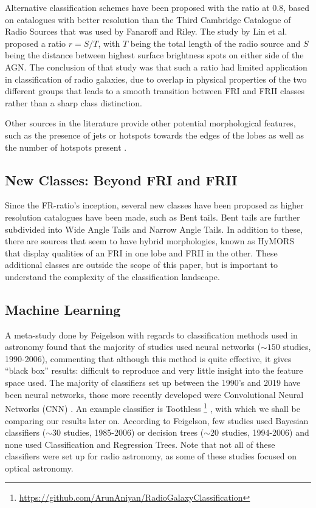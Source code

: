 \documentclass[conference]{IEEEtran}
\begin{document}
Alternative classification schemes have been proposed with the ratio at 0.8, based on catalogues with better resolution than the Third Cambridge Catalogue of Radio Sources that was used by Fanaroff and Riley. 
The study by Lin et al. \cite{lin_2010} proposed a ratio $r = S/T$, with $T$ being the total length of the radio source and $S$ being the distance between highest surface brightness spots on either side of the AGN. The conclusion of that study was that such a ratio had limited application in classification of radio galaxies, due to overlap in physical properties of the two different groups that leads to a smooth transition between FRI and FRII classes rather than a sharp class distinction.

Other sources in the literature provide other potential morphological features, 
such as the presence of jets \cite{owen_laing_1989} or hotspots towards the edges of 
the lobes \cite{gendre_wall_2009} as well as the number of hotspots present \cite{lukic2018}.

\subsection{New Classes: Beyond FRI and FRII}
Since the FR-ratio's inception, several new classes have been proposed as higher resolution catalogues have been made, such as Bent tails. Bent tails are further subdivided into Wide Angle Tails and Narrow Angle Tails. In addition to these, there are sources that seem to have hybrid morphologies, known as HyMORS \cite{gopalkrishna2000} that display qualities of an FRI in one lobe and FRII in the other. These additional classes are outside the scope of this paper, but is important to understand the complexity of the classification landscape.

\subsection{Machine Learning}
A meta-study done by Feigelson \cite{feigelson} with regards to classification 
methods used in astronomy found that the majority of studies used neural networks
($\sim150$ studies, 1990-2006), commenting that although this method is quite effective, 
it gives ``black box'' results: difficult to reproduce and very little insight into 
the feature space used. The majority of classifiers set up between the 1990's and 2019 
have been neural networks, those more recently developed were
Convolutional Neural Networks (CNN) \cite{hinton_2012}. An example classifier is Toothless \footnote{\url{https://github.com/ArunAniyan/RadioGalaxyClassification}}  \cite{aniyan_thorat_2017}, with which we shall be comparing our results later on. According to Feigelson, few studies used 
Bayesian classifiers ($\sim30$ studies, 1985-2006) or decision trees ($\sim20$ studies, 
1994-2006) and none used Classification and Regression Trees. Note that not all of these classifiers were set up for radio astronomy, as some of these studies focused on optical astronomy.
\end{document}
